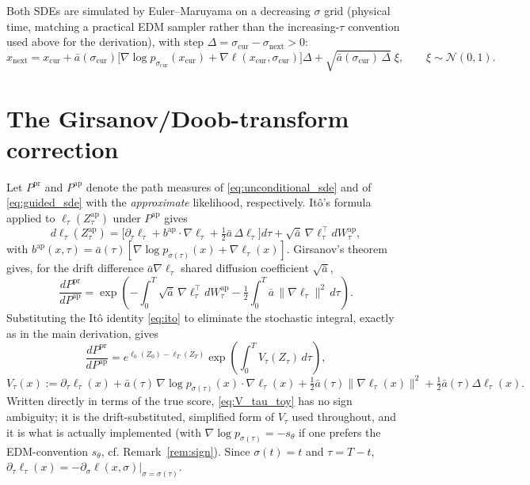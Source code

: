 \documentclass[english,10pt]{article}
\numberwithin{equation}{section}
\begin{document}
Both SDEs are simulated by Euler--Maruyama on a decreasing $\sigma$ grid
(physical time, matching a practical EDM sampler rather than the
increasing-$\tau$ convention used above for the derivation), with step
$\Delta=\sigma_{\mathrm{cur}}-\sigma_{\mathrm{next}}>0$:
\begin{equation}
x_{\mathrm{next}} = x_{\mathrm{cur}} + \bar a(\sigma_{\mathrm{cur}})\Big[\nabla\log p_{\sigma_{\mathrm{cur}}}(x_{\mathrm{cur}}) + \nabla \ell(x_{\mathrm{cur}},\sigma_{\mathrm{cur}})\Big]\Delta + \sqrt{\bar a(\sigma_{\mathrm{cur}})\,\Delta}\;\xi, \qquad \xi\sim\mathcal N(0,1).
\label{eq:euler_maruyama}
\end{equation}

\section{The Girsanov/Doob-transform correction}
\label{sec:girsanov}

Let $P^{\mathrm{pr}}$ and $P^{\mathrm{ap}}$ denote the path measures of
\eqref{eq:unconditional_sde} and of \eqref{eq:guided_sde} with the
\emph{approximate} likelihood, respectively. Itô's formula applied to
$\ell_\tau(Z_\tau^{\mathrm{ap}})$ under $P^{\mathrm{ap}}$ gives
\begin{equation}
d\ell_\tau(Z_\tau^{\mathrm{ap}}) = \Big[\partial_\tau\ell_\tau + b^{\mathrm{ap}}\!\cdot\!\nabla\ell_\tau + \tfrac12\bar a\,\Delta\ell_\tau\Big]d\tau + \sqrt{\bar a}\,\nabla\ell_\tau^\top dW_\tau^{\mathrm{ap}},
\label{eq:ito}
\end{equation}
with $b^{\mathrm{ap}}(x,\tau)=\bar a(\tau)[\nabla\log p_{\sigma(\tau)}(x)+\nabla\ell_\tau(x)]$.
Girsanov's theorem \citep{oksendal2003stochastic} gives, for the drift
difference $\bar a\nabla\ell_\tau$ shared diffusion coefficient $\sqrt{\bar a}$,
\begin{equation}
\frac{dP^{\mathrm{pr}}}{dP^{\mathrm{ap}}} = \exp\left(-\int_0^T\sqrt{\bar a}\,\nabla\ell_\tau^\top dW_\tau^{\mathrm{ap}} - \tfrac12\int_0^T \bar a\,\|\nabla\ell_\tau\|^2\,d\tau\right).
\label{eq:girsanov_toy}
\end{equation}
Substituting the Itô identity \eqref{eq:ito} to eliminate the stochastic
integral, exactly as in the main derivation, gives
\begin{equation}
\frac{dP^{\mathrm{pr}}}{dP^{\mathrm{ap}}} = e^{\ell_0(Z_0)-\ell_T(Z_T)}\exp\left(\int_0^T V_\tau(Z_\tau)\,d\tau\right),
\label{eq:master}
\end{equation}
\begin{equation}
V_\tau(x) := \partial_\tau\ell_\tau(x) + \bar a(\tau)\,\nabla\log p_{\sigma(\tau)}(x)\cdot\nabla\ell_\tau(x) + \tfrac12\bar a(\tau)\|\nabla\ell_\tau(x)\|^2 + \tfrac12\bar a(\tau)\Delta\ell_\tau(x).
\label{eq:V_tau_toy}
\end{equation}
Written directly in terms of the true score, \eqref{eq:V_tau_toy} has no sign
ambiguity; it is the drift-substituted, simplified form of $V_\tau$ used
throughout, and it is what is actually implemented (with $\nabla\log
p_{\sigma(\tau)}=-s_\theta$ if one prefers the EDM-convention $s_\theta$, cf.
Remark~\ref{rem:sign}). Since $\sigma(t)=t$ and $\tau=T-t$, $\partial_\tau\ell_\tau(x) = -\partial_\sigma\ell(x,\sigma)|_{\sigma=\sigma(\tau)}$.
\end{document}
